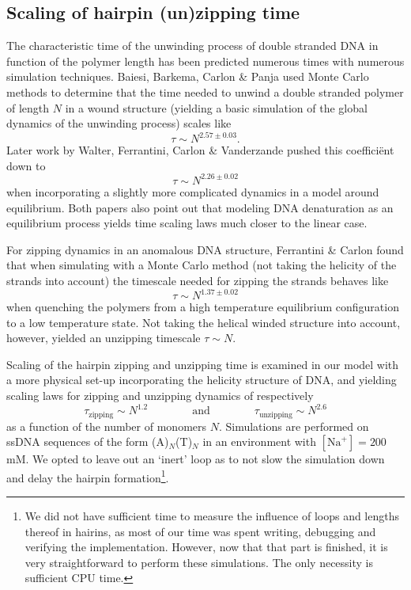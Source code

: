 \subsection{Scaling of hairpin (un)zipping time}
The characteristic time of the unwinding process of double stranded DNA in function of the polymer length has been predicted numerous times with numerous simulation techniques. 
Baiesi, Barkema, Carlon \& Panja \cite{carlon2010unwinding} used Monte Carlo methods to determine that the time needed to unwind a double stranded polymer of length $N$ in a wound structure (yielding a basic simulation of the global dynamics of the unwinding process) scales like
\begin{equation}
\tau \sim N^{2.57\pm 0.03}.
\end{equation}
Later work by Walter, Ferrantini, Carlon \& Vanderzande \cite{walter2011fractional} pushed this coeffici\"ent down to 
\begin{equation}
\tau \sim N^{2.26 \pm 0.02}
\end{equation}
when incorporating a slightly more complicated dynamics in a model around equilibrium. Both papers also point out that modeling DNA denaturation as an equilibrium process yields time scaling laws much closer to the linear case.

For zipping dynamics in an anomalous DNA structure, Ferrantini \& Carlon \cite{carlon2011anomalous} found that when simulating with a Monte Carlo method (not taking the helicity of the strands into account) the timescale needed for zipping the strands behaves like
\begin{equation}
\tau \sim N^{1.37\pm0.02}
\end{equation}
when quenching the polymers from a high temperature equilibrium configuration to a low temperature state. Not taking the helical winded structure into account, however, yielded an unzipping timescale $\tau \sim N$.

Scaling of the hairpin zipping and unzipping time is examined in our model with a more physical set-up incorporating the helicity structure of DNA, and yielding scaling laws for zipping and unzipping dynamics of respectively
\begin{equation}
\tau_\text{zipping} \sim N^{1.2} \qquad \qquad \text{and} \qquad \qquad \tau_\text{unzipping} \sim N^{2.6}\end{equation}
as a function of the number of monomers $N$.
Simulations are performed on ssDNA sequences of the form (A)$_N$(T)$_N$ in an environment with $[\text{Na}^+] = 200$\,mM.
We opted to leave out an `inert' loop as to not slow the simulation down and delay the hairpin formation\footnote{We did not have sufficient time to measure the influence of loops and lengths thereof in hairins, as most of our time was spent writing, debugging and verifying the implementation.
However, now that that part is finished, it is very straightforward to perform these simulations. The only necessity is sufficient CPU time.}. 

